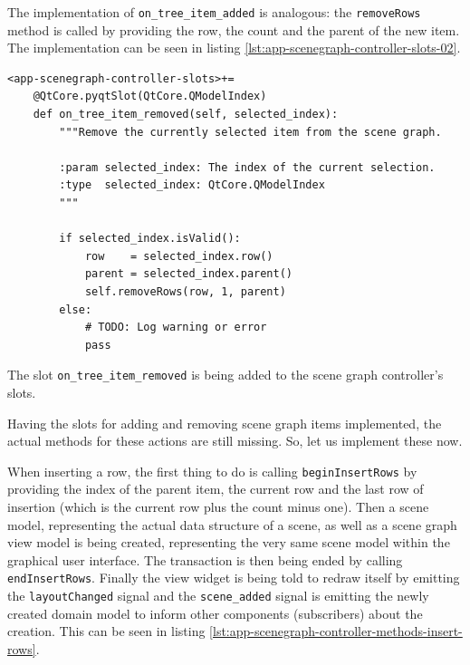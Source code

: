 \documentclass[10pt, openright, notitlepage]{scrreprt}
\begin{document}
The implementation of \texttt{on\_tree\_item\_added} is analogous: the
\texttt{removeRows} method is called by providing the row, the count and
the parent of the new item. The implementation can be seen in listing
\ref{lst:app-scenegraph-controller-slots-02}.

\begin{listing}[H]
\begin{verbatim}
<app-scenegraph-controller-slots>+=
    @QtCore.pyqtSlot(QtCore.QModelIndex)
    def on_tree_item_removed(self, selected_index):
        """Remove the currently selected item from the scene graph.
    
        :param selected_index: The index of the current selection.
        :type  selected_index: QtCore.QModelIndex
        """
    
        if selected_index.isValid():
            row    = selected_index.row()
            parent = selected_index.parent()
            self.removeRows(row, 1, parent)
        else:
            # TODO: Log warning or error
            pass
\end{verbatim}
\caption{\label{lst:app-scenegraph-controller-slots-02}
The slot \texttt{on\_tree\_item\_removed} is being added to the scene graph controller's slots.}
\end{listing}

Having the slots for adding and removing scene graph items implemented, the
actual methods for these actions are still missing. So, let us implement these
now.

When inserting a row, the first thing to do is calling
\texttt{beginInsertRows} by providing the index of the parent item, the
current row and the last row of insertion (which is the current row plus the
count minus one). Then a scene model, representing the actual data structure of
a scene, as well as a scene graph view model is being created, representing the
very same scene model within the graphical user interface. The transaction is
then being ended by calling \texttt{endInsertRows}. Finally the view widget
is being told to redraw itself by emitting the \texttt{layoutChanged} signal
and the \texttt{scene\_added} signal is emitting the newly created domain
model to inform other components (subscribers) about the creation. This can be
seen in listing \ref{lst:app-scenegraph-controller-methods-insert-rows}.
\end{document}
